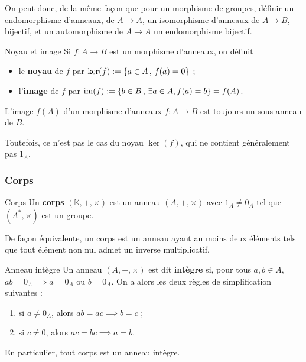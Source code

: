     On peut donc, de la même façon que pour un morphisme de groupes, définir un endomorphisme d’anneaux, de $A \to A$, un isomorphisme d’anneaux de $A \to B$, bijectif, et un automorphisme de $A \to A$ un endomorphisme bijectif.

    \begin{defi}{Noyau et image}{}
        Si $f : A \to B$ est un morphisme d’anneaux, on définit
        \begin{itemize}
            \item le \textbf{noyau} de $f$ par $\ker(f) := \left\{ a \in A \, , \, f(a) = 0 \right\}$ ;
            \item l’\textbf{image} de $f$ par $\operatorname{im}(f) := \left\{ b \in B \, , \, \exists a \in A, f(a) = b \right\} = f(A)$.
        \end{itemize}
    \end{defi}

    \begin{prop}{}{}
        L’image $f(A)$ d’un morphisme d’anneaux $f : A \to B$ est toujours un sous-anneau de $B$.
    \end{prop}

    Toutefois, ce n’est pas le cas du noyau $\ker(f)$, qui ne contient généralement pas $1_A$.

    \subsubsection{Corps}

    \begin{defi}{Corps}{}
        Un \textbf{corps} $(\mathbb{K}, +, \times)$ est un anneau $(A,+,\times)$ avec $1_A \neq 0_A$ tel que $(A^*, \times)$ est un groupe.

        De façon équivalente, un corps est un anneau ayant au moins deux éléments tels que tout élément non nul admet un inverse multiplicatif.
    \end{defi}

    \begin{defitheo}{Anneau intègre}{}
        Un anneau $(A,+,\times)$ est dit \textbf{intègre} si, pour tous $a,b \in A$, $ab = 0_A \implies a = 0_A \text{ ou } b = 0_A$. On a alors les deux règles de simplification suivantes :
        \begin{enumerate}
            \item si $a \neq 0_A$, alors $ab = ac \implies b = c$ ;
            \item si $c \neq 0$, alors $ac = bc \implies a = b$.
        \end{enumerate}
        En particulier, tout corps est un anneau intègre.
    \end{defitheo}

